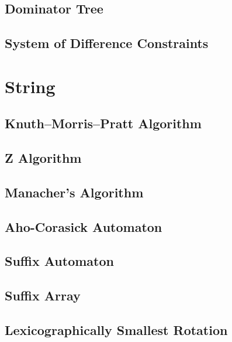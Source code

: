 \documentclass[a4paper,10pt,twocolumn,oneside]{article}
\begin{document}
\subsection{Dominator Tree}

\subsection{System of Difference Constraints}

\section{String}
\subsection{Knuth–Morris–Pratt Algorithm}

\subsection{Z Algorithm}

\subsection{Manacher's Algorithm}

\subsection{Aho-Corasick Automaton}

\subsection{Suffix Automaton}

\subsection{Suffix Array}

% 
% 
\subsection{Lexicographically Smallest Rotation}

\end{document}
